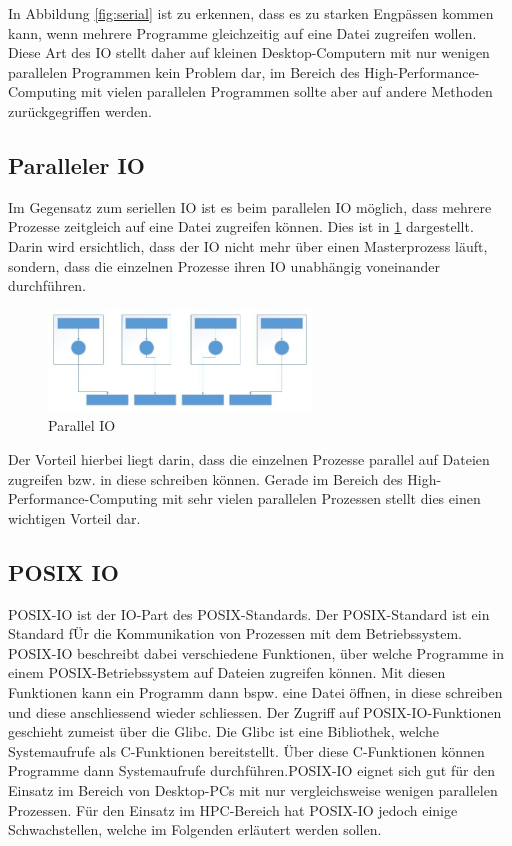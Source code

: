 In Abbildung \ref{fig:serial} ist zu erkennen, dass es zu starken Engp\"assen kommen kann, wenn mehrere Programme gleichzeitig auf eine Datei zugreifen wollen. Diese Art des IO stellt daher auf kleinen Desktop-Computern mit nur wenigen parallelen Programmen kein Problem dar, im Bereich des High-Performance-Computing mit vielen parallelen Programmen sollte aber auf andere Methoden zur\"uckgegriffen werden.\cite{Cazes.26.09.2013}

\subsection{Paralleler IO}
Im Gegensatz zum seriellen IO ist es beim parallelen IO m\"oglich, dass mehrere Prozesse zeitgleich auf eine Datei zugreifen k\"onnen. Dies ist in \ref{fig:parallel} dargestellt. Darin wird ersichtlich, dass der IO nicht mehr \"uber einen Masterprozess l\"auft, sondern, dass die einzelnen Prozesse ihren IO unabh\"angig voneinander durchf\"uhren.
\begin{figure}[h]
	\centering
	\includegraphics[width=7cm]{fig/ParallelIO.JPG}
	\caption{Parallel IO \cite{Cazes.26.09.2013}}
	\label{fig:parallel}
\end{figure}
Der Vorteil hierbei liegt darin, dass die einzelnen Prozesse parallel auf Dateien zugreifen bzw. in diese schreiben k\"onnen. Gerade im Bereich des High-Performance-Computing mit sehr vielen parallelen Prozessen stellt dies einen wichtigen Vorteil dar.\cite{Cazes.26.09.2013}
\subsection{POSIX IO}
POSIX-IO ist der IO-Part des POSIX-Standards. Der POSIX-Standard ist ein Standard f\"Ur die Kommunikation von Prozessen mit dem Betriebssystem. POSIX-IO beschreibt dabei verschiedene Funktionen, \"uber welche Programme in einem POSIX-Betriebssystem auf Dateien zugreifen k\"onnen. Mit diesen Funktionen kann ein Programm dann bspw. eine Datei \"offnen, in diese schreiben und diese anschliessend wieder schliessen. Der Zugriff auf POSIX-IO-Funktionen geschieht zumeist \"uber die Glibc. Die Glibc ist eine Bibliothek, welche Systemaufrufe als C-Funktionen bereitstellt. \"Uber diese C-Funktionen k\"onnen Programme dann Systemaufrufe durchf\"uhren.\newline POSIX-IO eignet sich gut f\"ur den Einsatz im Bereich von Desktop-PCs mit nur vergleichsweise wenigen parallelen Prozessen. F\"ur den Einsatz im HPC-Bereich hat POSIX-IO jedoch einige Schwachstellen, welche im Folgenden erl\"autert werden sollen.
